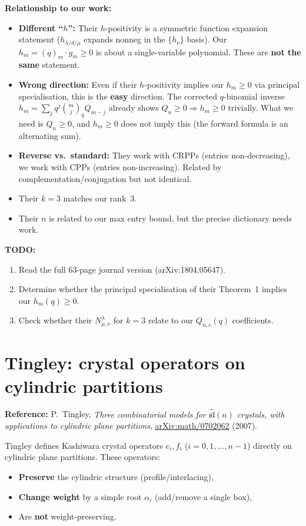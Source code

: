 \documentclass[11pt]{article}
\begin{document}
\medskip
\noindent\textbf{Relationship to our work:}
\begin{itemize}
  \item \textbf{Different ``$h$'':}
    Their $h$-positivity is a symmetric function expansion statement
    ($h_{\lambda/d/\mu}$ expands nonneg in the $\{h_\nu\}$ basis).
    Our $h_m = (q)_m \cdot g_m \geq 0$ is about a single-variable
    polynomial.  These are \textbf{not the same} statement.
  \item \textbf{Wrong direction:}
    Even if their $h$-positivity implies our $h_m \geq 0$ via
    principal specialisation, this is the \textbf{easy} direction.
    The corrected $q$-binomial inverse
    $h_m = \sum_j q^j \binom{m}{j}_q Q_{m-j}$ already shows
    $Q_n \geq 0 \Rightarrow h_m \geq 0$ trivially.  What we need
    is $Q_n \geq 0$, and $h_m \geq 0$ does not imply this
    (the forward formula is an alternating sum).
  \item \textbf{Reverse vs.\ standard:}
    They work with CRPPs (entries non-decreasing), we work with
    CPPs (entries non-increasing).  Related by
    complementation/conjugation but not identical.
  \item Their $k = 3$ matches our rank~3.
  \item Their $n$ is related to our max entry bound, but the
    precise dictionary needs work.
\end{itemize}

\medskip
\noindent\textbf{TODO:}
\begin{enumerate}
  \item Read the full 63-page journal version (arXiv:1804.05647).
  \item Determine whether the principal specialisation of their
    Theorem~1 implies our $h_m(q) \geq 0$.
  \item Check whether their $N^{\lambda}_{\mu,\nu}$ for $k = 3$
    relate to our $Q_{n,c}(q)$ coefficients.
\end{enumerate}


\section{Tingley: crystal operators on cylindric partitions}

\textbf{Reference:} P.~Tingley,
\emph{Three combinatorial models for $\widehat{\mathfrak{sl}}(n)$
crystals, with applications to cylindric plane partitions},
\href{https://arxiv.org/abs/math/0702062}{arXiv:math/0702062} (2007).

\medskip
\noindent
Tingley defines Kashiwara crystal operators $e_i, f_i$
($i = 0, 1, \ldots, n-1$) directly on cylindric plane partitions.
These operators:
\begin{itemize}
  \item \textbf{Preserve} the cylindric structure (profile/interlacing),
  \item \textbf{Change weight} by a simple root $\alpha_i$ (add/remove
    a single box),
  \item Are \textbf{not} weight-preserving.
\end{itemize}
\end{document}
